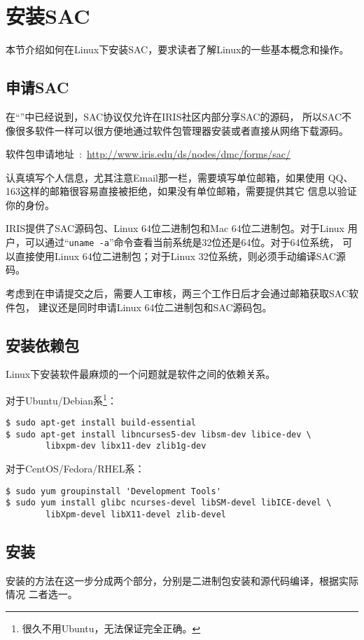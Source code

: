 \section{安装SAC}
\label{sec:sac-install}
本节介绍如何在Linux下安装SAC，要求读者了解Linux的一些基本概念和操作。

\subsection*{申请SAC}
在``''中已经说到，SAC协议仅允许在IRIS社区内部分享SAC的源码，
所以SAC不像很多软件一样可以很方便地通过软件包管理器安装或者直接从网络下载源码。

软件包申请地址~:~\url{http://www.iris.edu/ds/nodes/dmc/forms/sac/}

认真填写个人信息，尤其注意Email那一栏，需要填写单位邮箱，如果使用
QQ、163这样的邮箱很容易直接被拒绝，如果没有单位邮箱，需要提供其它
信息以验证你的身份。

IRIS提供了SAC源码包、Linux 64位二进制包和Mac 64位二进制包。对于Linux
用户，可以通过``\lstinline{uname -a}''命令查看当前系统是32位还是64位。对于64位系统，
可以直接使用Linux 64位二进制包；对于Linux 32位系统，则必须手动编译SAC源码。

考虑到在申请提交之后，需要人工审核，两三个工作日后才会通过邮箱获取SAC软件包，
建议还是同时申请Linux 64位二进制包和SAC源码包。

\subsection*{安装依赖包}
Linux下安装软件最麻烦的一个问题就是软件之间的依赖关系。

对于Ubuntu/Debian系\footnote{很久不用Ubuntu，无法保证完全正确。}：
\begin{lstlisting}[style=Shell]
$ sudo apt-get install build-essential
$ sudo apt-get install libncurses5-dev libsm-dev libice-dev \
        libxpm-dev libx11-dev zlib1g-dev
\end{lstlisting}

对于CentOS/Fedora/RHEL系：
\begin{lstlisting}[style=Shell]
$ sudo yum groupinstall 'Development Tools'
$ sudo yum install glibc ncurses-devel libSM-devel libICE-devel \
        libXpm-devel libX11-devel zlib-devel
\end{lstlisting}

\subsection*{安装}
安装的方法在这一步分成两个部分，分别是二进制包安装和源代码编译，根据实际情况
二者选一。
